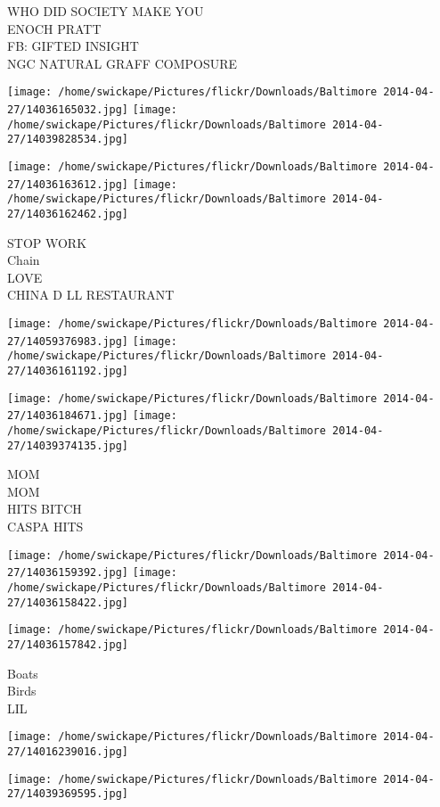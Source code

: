 \documentclass[10pt,letterpaper]{article}
\begin{document}
WHO DID SOCIETY MAKE YOU\\
ENOCH PRATT\\
FB: GIFTED INSIGHT\\
NGC NATURAL GRAFF COMPOSURE
\pagebreak

\texttt{[image: /home/swickape/Pictures/flickr/Downloads/Baltimore 2014-04-27/14036165032.jpg]}
\texttt{[image: /home/swickape/Pictures/flickr/Downloads/Baltimore 2014-04-27/14039828534.jpg]}

\texttt{[image: /home/swickape/Pictures/flickr/Downloads/Baltimore 2014-04-27/14036163612.jpg]}
\texttt{[image: /home/swickape/Pictures/flickr/Downloads/Baltimore 2014-04-27/14036162462.jpg]}

STOP WORK\\
Chain\\
LOVE\\
CHINA D LL RESTAURANT
\pagebreak

\texttt{[image: /home/swickape/Pictures/flickr/Downloads/Baltimore 2014-04-27/14059376983.jpg]}
\texttt{[image: /home/swickape/Pictures/flickr/Downloads/Baltimore 2014-04-27/14036161192.jpg]}

\texttt{[image: /home/swickape/Pictures/flickr/Downloads/Baltimore 2014-04-27/14036184671.jpg]}
\texttt{[image: /home/swickape/Pictures/flickr/Downloads/Baltimore 2014-04-27/14039374135.jpg]}

MOM\\
MOM\\
HITS BITCH\\
CASPA HITS
\pagebreak

\texttt{[image: /home/swickape/Pictures/flickr/Downloads/Baltimore 2014-04-27/14036159392.jpg]}
\texttt{[image: /home/swickape/Pictures/flickr/Downloads/Baltimore 2014-04-27/14036158422.jpg]}

\vspace{0.25in}
\texttt{[image: /home/swickape/Pictures/flickr/Downloads/Baltimore 2014-04-27/14036157842.jpg]}

Boats\\
Birds\\
LIL
\pagebreak

\texttt{[image: /home/swickape/Pictures/flickr/Downloads/Baltimore 2014-04-27/14016239016.jpg]}

\vspace{0.25in}
\texttt{[image: /home/swickape/Pictures/flickr/Downloads/Baltimore 2014-04-27/14039369595.jpg]}
\end{document}
